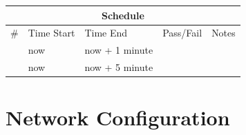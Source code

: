 \documentclass{article}
\begin{document}
\begin{enumerate}
	\vspace{0.25in}
	\begin{tabular}{|l|l|l|l|l|}
		\hline
		\multicolumn{5}{|c|}{Schedule} \\
		\hline
		\# & Time Start & Time End & Pass/Fail & \hspace{0.5in}Notes\hspace{0.5in} \\
		\hline
		& now & now + 1 minute & & \\
		\hline
		& now & now + 5 minute & & \\
		\hline
	\end{tabular}

\end{enumerate}



\clearpage
\appendix

\section{Network Configuration}
\label{app:networking}


\end{document}
